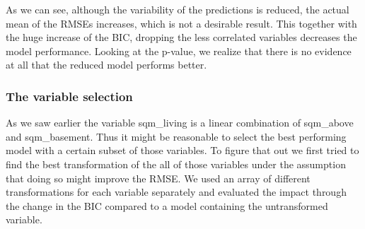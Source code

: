 \documentclass[table]{article}
\begin{document}
As we can see, although the variability of the predictions is reduced,
the actual mean of the RMSEs increases, which is not a desirable result.
This together with the huge increase of the BIC, dropping the less
correlated variables decreases the model performance. Looking at the
p-value, we realize that there is no evidence at all that the reduced
model performs better.

\subsubsection{The variable selection}\label{the-variable-selection}

As we saw earlier the variable sqm\_living is a linear combination of
sqm\_above and sqm\_basement. Thus it might be reasonable to select the
best performing model with a certain subset of those variables. To
figure that out we first tried to find the best transformation of the
all of those variables under the assumption that doing so might improve
the RMSE. We used an array of different transformations for each
variable separately and evaluated the impact through the change in the
BIC compared to a model containing the untransformed variable.
\hfill\break
\end{document}
